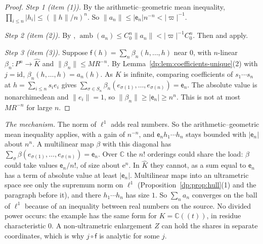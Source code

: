\documentclass[11pt]{amsart}
\theoremstyle{definition}
\theoremstyle{remark}
\numberwithin{equation}{section}
\newcommand{\id}{\mathrm{id}}
\newcommand{\abs}[1]{\lvert #1\rvert}
\newcommand{\norm}[1]{\lVert #1\rVert}
\newcommand{\Kh}{\widehat K}
\theoremstyle{plain}
\theoremstyle{definition}
\theoremstyle{plain}
\begin{document}
\begin{proof}
\emph{Step 1 (item (1)).} By the arithmetic--geometric mean inequality, $\prod_{i\le n}\abs{h_i}\le(\norm h/n)^n$. So $\norm{a_n}\le\abs{\mathsf e_n}n^{-n}<\abs\varpi^{-1}$.

\emph{Step 2 (item (2)).} By \cite[Theorem~14.39(2)]{I}, $\operatorname{amb}(a_n)\le C_0^n\norm{a_n}<\abs\varpi^{-1}C_0^n$. Then \cite[Proposition~14.9(1)]{I} and \cite[Remark~14.13]{I} apply.

\emph{Step 3 (item (3)).} Suppose $\mathsf f(h)=\sum_n\beta_n(h,\dots,h)$ near $0$, with $n$-linear $\beta_n\colon P^n\to\Kh$ and $\norm{\beta_n}\le MR^{-n}$. By Lemma~\ref{dp:lem:coefficients-unique}(2) with $j=\id$, $\beta_n(h,\dots,h)=a_n(h)$. As $K$ is infinite, comparing coefficients of $s_1\cdots s_n$ at $h=\sum_{i\le n}s_ie_i$ gives $\sum_{\sigma\in S_n}\beta_n(e_{\sigma(1)},\dots,e_{\sigma(n)})=\mathsf e_n$. The absolute value is nonarchimedean and $\norm{e_i}=1$, so $\norm{\beta_n}\ge\abs{\mathsf e_n}\ge n^n$. This is not at most $MR^{-n}$ for large $n$.
\end{proof}

\emph{The mechanism.} The norm of $\ell^1$ adds real numbers. So the arithmetic--geometric mean inequality applies, with a gain of $n^{-n}$, and $\mathsf e_nh_1\cdots h_n$ stays bounded with $\abs{\mathsf e_n}$ about $n^n$. A multilinear map $\beta$ with this diagonal has $\sum_\sigma\beta(e_{\sigma(1)},\dots,e_{\sigma(n)})=\mathsf e_n$. Over $\mathbb C$ the $n!$ orderings could share the load: $\beta$ could take values $\mathsf e_n/n!$, of size about $\mathrm e^n$. In $\Kh$ they cannot, as a sum equal to $\mathsf e_n$ has a term of absolute value at least $\abs{\mathsf e_n}$. Multilinear maps into an ultrametric space see only the supremum norm on $\ell^1$ (Proposition~\ref{dp:prop:hull}(1) and the paragraph before it), and there $h_1\cdots h_n$ has size $1$. So $\sum_na_n$ converges on the ball of $\ell^1$ because of an inequality between real numbers on the source. No divided power occurs: the example has the same form for $K=\mathbb C((t))$, in residue characteristic $0$. A non-ultrametric enlargement $Z$ can hold the shares in separate coordinates, which is why $j\circ\mathsf f$ is analytic for some $j$.
\end{document}
